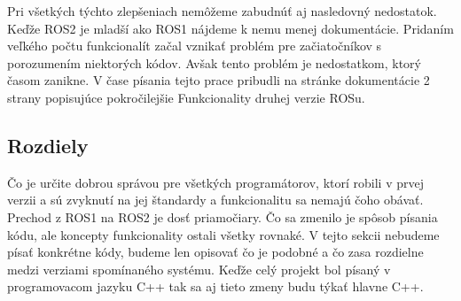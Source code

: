 Pri všetkých týchto zlepšeniach nemôžeme zabudnúť aj nasledovný nedostatok. Keďže ROS2 je mladší ako ROS1 nájdeme k nemu menej dokumentácie.
Pridaním veľkého počtu funkcionalít začal vznikať problém pre začiatočníkov s porozumením niektorých kódov. Avšak tento problém je nedostatkom,
ktorý časom zanikne. V čase písania tejto prace pribudli na stránke dokumentácie 2 strany popisujúce pokročilejšie Funkcionality druhej verzie ROSu.

\subsection{Rozdiely}

Čo je určite dobrou správou pre všetkých programátorov, ktorí robili v prvej verzii a sú zvyknutí na jej štandardy a funkcionalitu sa nemajú čoho obávať.
Prechod z ROS1 na ROS2 je dosť priamočiary. Čo sa zmenilo je spôsob písania kódu, ale koncepty funkcionality ostali všetky rovnaké. V tejto sekcii nebudeme
písať konkrétne kódy, budeme len opisovať čo je podobné a čo zasa rozdielne medzi verziami spomínaného systému. Keďže celý projekt bol písaný v programovacom
jazyku C++ tak sa aj tieto zmeny budu týkať hlavne C++.

